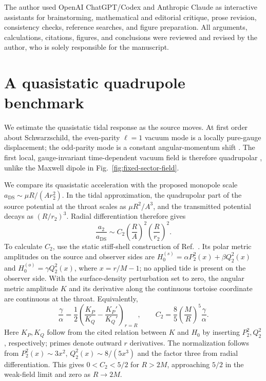 \documentclass[aps,prd,10pt,onecolumn,nofootinbib,superscriptaddress,floatfix]{revtex4-2}
\begin{document}
The author used OpenAI ChatGPT/Codex and Anthropic Claude as interactive
assistants for brainstorming, mathematical and editorial critique, prose
revision, consistency checks, reference searches, and figure preparation.  All
arguments, calculations, citations, figures, and conclusions were reviewed and
revised by the author, who is solely responsible for the manuscript.

\appendix
\section{A quasistatic quadrupole benchmark}
\label{app:quadrupole}

We estimate the quasistatic tidal response as the source moves.  At first
order about Schwarzschild, the even-parity $\ell=1$ vacuum mode is a
locally pure-gauge displacement; the odd-parity mode is a constant
angular-momentum shift \cite{MartelPoisson2005SchwarzschildPerturbations}.
The first local, gauge-invariant time-dependent vacuum field is therefore
quadrupolar \cite{Thorne1980Multipole}, unlike the Maxwell dipole in
Fig.~\ref{fig:fixed-sector-field}.

We compare its quasistatic acceleration with the proposed monopole scale
$a_{\mathrm{DS}}\sim\mu R/(Ar_2^2)$.
In the tidal approximation, the quadrupolar part of the source potential
at the throat scales as $\mu R^2/A^3$, and the transmitted potential
decays as $(R/r_2)^3$.
Radial differentiation therefore gives
\begin{equation}
 \frac{a_2}{a_{\mathrm{DS}}}
 \sim C_2\left(\frac{R}{A}\right)^2
          \left(\frac{R}{r_2}\right)^2.
 \label{eq:quadrupole-benchmark}
\end{equation}
To calculate $C_2$, use the static stiff-shell construction of
Ref.~\cite[Appendix~D.1]{CardosoEtAl2017LoveNumbers}.  Its polar metric
amplitudes on the source and observer sides are
$H_0^{(s)}=\alpha P_2^2(x)+\beta Q_2^2(x)$ and
$H_0^{(o)}=\gamma Q_2^2(x)$, where $x=r/M-1$; no applied tide is present
on the observer side.  With the surface-density perturbation set to zero,
the angular metric amplitude $K$ and its derivative along the continuous
tortoise coordinate are continuous at the throat.  Equivalently,
\begin{equation}
 \frac{\gamma}{\alpha}
 =\frac12\left(\frac{K_P}{K_Q}-\frac{K_P'}{K_Q'}\right)_{r=R},
 \qquad
 C_2=\frac85\left(\frac{M}{R}\right)^5\frac{\gamma}{\alpha}.
 \label{eq:quadrupole-transfer}
\end{equation}
Here $K_P,K_Q$ follow from the cited relation between $K$ and $H_0$ by
inserting $P_2^2,Q_2^2$, respectively; primes denote outward $r$ derivatives.
The normalization follows from $P_2^2(x)\sim3x^2$,
$Q_2^2(x)\sim8/(5x^3)$ and the factor three from radial differentiation.
This gives $0<C_2<5/2$ for $R>2M$, approaching $5/2$ in the weak-field
limit and zero as $R\to2M$.
\end{document}
